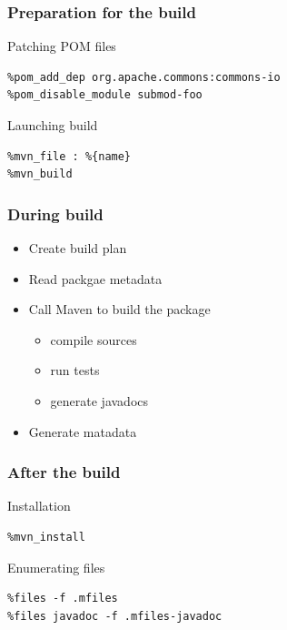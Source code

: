 \documentclass[pdftex,unicode,xcolor=table]{beamer}
\begin{document}
\begin{frame}[fragile]
  \frametitle{Preparation for the build}
  \begin{block}{Patching POM files}
    \scriptsize
\begin{verbatim}
%pom_add_dep org.apache.commons:commons-io
%pom_disable_module submod-foo
\end{verbatim}
  \end{block}
  \begin{block}{Launching build}
    \scriptsize
\begin{verbatim}
%mvn_file : %{name}
%mvn_build
\end{verbatim}
  \end{block}
\end{frame}


\begin{frame}
  \frametitle{During build}
  \begin{itemize}
    \item Create build plan
    \item Read packgae metadata
    \item Call Maven to build the package
    \begin{itemize}
      \item compile sources
      \item run tests
      \item generate javadocs
    \end{itemize}
    \item Generate matadata
  \end{itemize}
\end{frame}


\begin{frame}[fragile]
  \frametitle{After the build}
  \begin{block}{Installation}
    \scriptsize
\begin{verbatim}
%mvn_install
\end{verbatim}
  \end{block}
  \begin{block}{Enumerating files}
    \scriptsize
\begin{verbatim}
%files -f .mfiles
%files javadoc -f .mfiles-javadoc
\end{verbatim}
  \end{block}
\end{frame}
\end{document}
